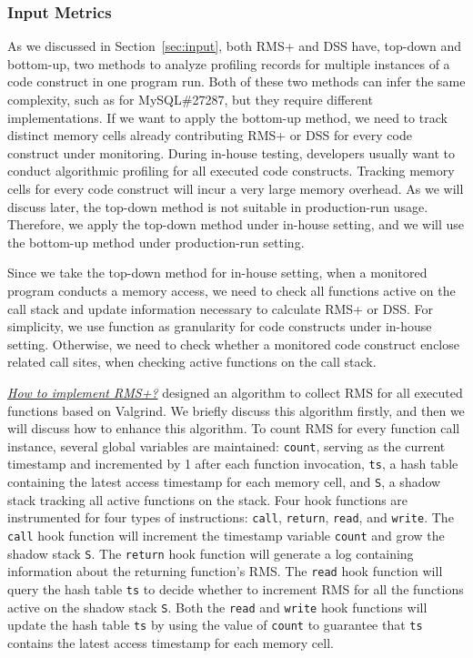 \subsubsection{Input Metrics}
As we discussed in Section~\ref{sec:input},
both RMS+ and DSS have, top-down and bottom-up, 
two methods to analyze profiling records for multiple instances of 
a code construct in one program run. 
Both of these two methods can infer the same complexity, 
such as for MySQL\#27287,
but they require different implementations.
If we want to apply the bottom-up method,
we need to track distinct memory cells already contributing 
RMS+ or DSS for every code construct under monitoring.
During in-house testing, developers usually want to conduct algorithmic profiling 
for all executed code constructs. 
Tracking memory cells for every code construct will 
incur a very large memory overhead.  
As we will discuss later, the top-down method 
is not suitable in production-run usage. 
Therefore, we apply the top-down method under in-house setting, 
and we will use the bottom-up method under production-run setting. 

Since we take the top-down method for in-house setting,
when a monitored program conducts a memory access,
we need to check all functions active on the call stack and 
update information necessary to calculate RMS+ or DSS. 
For simplicity, we use function as granularity for code constructs under in-house setting.
Otherwise, we need to check whether a monitored code construct enclose related call sites, 
when checking active functions on the call stack.  

{\textit{\underline{How to implement RMS+?}}}
\citet{Aprof1,Aprof2} designed an algorithm to collect 
RMS for all executed functions based on 
Valgrind. We briefly discuss this algorithm firstly, 
and then we will discuss how to enhance this algorithm. 
To count RMS for every function call instance, 
several global variables are maintained: 
\texttt{count}, serving as the current timestamp and incremented 
by 1 after each function invocation,  
\texttt{ts}, a hash table containing the latest access timestamp for each memory cell, 
and \texttt{S}, a shadow stack tracking all active functions on the stack. 
Four hook functions are instrumented for four types of instructions:
\texttt{call}, \texttt{return}, \texttt{read}, and \texttt{write}.
The \texttt{call} hook function will increment the timestamp variable \texttt{count} 
and grow the shadow stack \texttt{S}.
The \texttt{return} hook function will generate a 
log containing information about the returning function's RMS.
The \texttt{read} hook function will query the hash table \texttt{ts} to decide whether 
to increment RMS for all the functions active on the shadow stack \texttt{S}.
Both the \texttt{read} and \texttt{write} hook 
functions will update the hash table \texttt{ts}
by using the value of \texttt{count} to guarantee that \texttt{ts} 
contains the latest access timestamp for each memory cell. 

